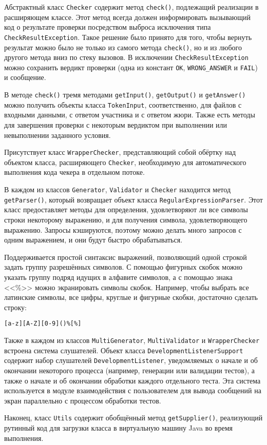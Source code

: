 Абстрактный класс \texttt{Checker} содержит метод \texttt{check()}, подлежащий реализации в расширяющем классе. Этот метод всегда должен информировать вызывающий код о результате проверки посредством выброса исключения типа \texttt{Check\-Result\-Exception}. Такое решение было принято для того, чтобы вернуть результат можно было не только из самого метода \texttt{check()}, но и из любого другого метода вниз по стеку вызовов. В исключении \texttt{Check\-Result\-Exception} можно сохранить вердикт проверки (одна из констант \texttt{OK}, \texttt{WRONG\_ANSWER} и \texttt{FAIL}) и сообщение.

В методе \texttt{check()} тремя методами \texttt{getInput()}, \texttt{getOutput()} и \texttt{getAnswer()} можно получить объекты класса \texttt{Token\-Input}, соответственно, для файлов с входными данными, с ответом участника и с ответом жюри. Также есть методы для завершения проверки с некоторым вердиктом при выполнении или невыполнении заданного условия.

Присутствует класс \texttt{Wrapper\-Checker}, представляющий собой обёртку над объектом класса, расширяющего \texttt{Checker}, необходимую для автоматического выполнения кода чекера в отдельном потоке.

В каждом из классов \texttt{Generator}, \texttt{Validator} и \texttt{Checker} находится метод \texttt{getParser()}, который возвращает объект класса \texttt{RegularExpressionParser}. Этот класс предоставляет методы для определения, удовлетворяют ли все символы строки некоторому выражению, и для получения символа, удовлетворяющего выражению. Запросы кэшируются, поэтому можно делать много запросов с одним выражением, и они будут быстро обрабатываться.

Поддерживается простой синтаксис выражений, позволяющий одной строкой задать группу разрешённых символов. С помощью фигурных скобок можно указать группу подряд идущих в алфавите символов, а с помощью знака <<\%>> можно экранировать символы скобок. Например, чтобы выбрать все латинские символы, все цифры, круглые и фигурные скобки, достаточно сделать строку:

\begin{center}
\texttt{[a-z][A-Z][0-9]()\%[\%]}
\end{center}

Также в каждом из классов \texttt{Multi\-Generator}, \texttt{Multi\-Validator} и \texttt{Wrapper\-Checker} встроена система слушателей. Объект класса \texttt{Development\-Listener\-Sup\-port} содержит набор слушателей \texttt{Development\-Listener}, уведомляемых о начале и об окончании некоторого процесса (например, генерации или валидации тестов), а также о начале и об окончании обработки каждого отдельного теста. Эта система используется в модуле взаимодействия с пользователем для вывода сообщений на экран параллельно с процессом обработки тестов.

Наконец, класс \texttt{Utils} содержит обобщённый метод \texttt{getSupplier()}, реализующий рутинный код для загрузки класса в виртуальную машину Java во время выполнения.